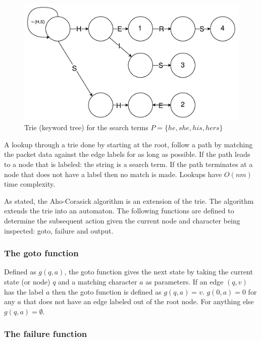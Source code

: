\documentclass{article}
\begin{document}
\begin{figure}[h!bt]
  \label{trie}
  \centering
  \makeatletter
  \includegraphics[width=\textwidth]{images/trie.pdf}
  \caption{Trie (keyword tree) for the search terms \(P = \{he, she, his, hers\}\)}
\end{figure}

A lookup through a trie done by starting at the root, follow a path by matching the packet data against the edge labels for as long as possible. If the path leads to a node that is labeled: the string is a search term. If the path terminates at a node that does not have a label then no match is made. Lookups have \(O(nm)\) time complexity.

As stated, the Aho-Corasick algorithm is an extension of the trie. The algorithm extends the trie into an automaton. The following functions are defined to determine the subsequent action given the current node and character being inspected: goto, failure and output.

\subsubsection{The goto function} \label{goto-function}

Defined as \(g(q, a)\), the goto function gives the next state by taking the current state (or node) \(q\) and a matching character \(a\) as parameters. If an edge \((q, v)\) has the label \(a\) then the goto function is defined as \(g(q, a) = v\). \(g(0, a) = 0\) for any \(a\) that does not have an edge labeled out of the root node. For anything else \(g(q, a) =  \emptyset\).

\subsubsection{The failure function} \label{failure-function}
\end{document}
